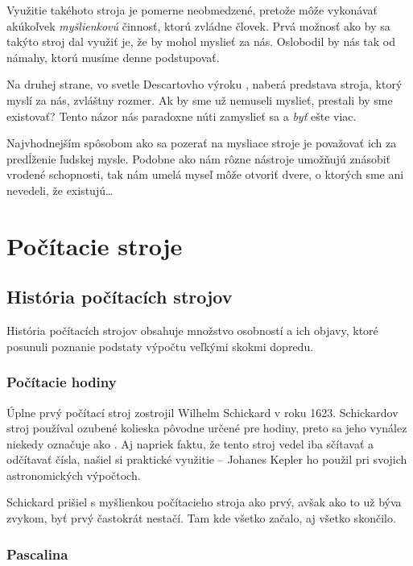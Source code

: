 Využitie takéhoto stroja je pomerne neobmedzené, pretože môže vykonávať akúkoľvek \emph{myšlienkovú} činnosť, ktorú zvládne človek. Prvá možnosť ako by sa takýto stroj dal využiť je, že by mohol myslieť za nás. Oslobodil by nás tak od námahy, ktorú musíme denne podstupovať.

Na druhej strane, vo svetle Descartovho výroku \emph{}, naberá predstava stroja, ktorý myslí za nás, zvláštny rozmer. Ak by sme už nemuseli myslieť, prestali by sme existovať? Tento názor nás paradoxne núti zamyslieť sa a \emph{byť} ešte viac.

Najvhodnejším spôsobom ako sa pozerať na mysliace stroje je považovať ich za predĺženie ľudskej mysle. Podobne ako nám rôzne nástroje umožňujú znásobiť vrodené schopnosti, tak nám umelá myseľ môže otvoriť dvere, o ktorých sme ani nevedeli, že existujú\dots

\section{Počítacie stroje}

\subsection[História]{História počítacích strojov}

História počítacích strojov obsahuje množstvo osobností a ich objavy, ktoré posunuli poznanie podstaty výpočtu veľkými skokmi dopredu.

\subsubsection{Počítacie hodiny}

Úplne prvý počítací stroj zostrojil Wilhelm Schickard v roku 1623. Schickardov stroj používal ozubené kolieska pôvodne určené pre hodiny, preto sa jeho vynález niekedy označuje ako . Aj napriek faktu, že tento stroj vedel iba sčítavať a odčítavať čísla, našiel si praktické využitie -- Johanes Kepler ho použil pri svojich astronomických výpočtoch.

Schickard prišiel s myšlienkou počítacieho stroja ako prvý, avšak ako to už býva zvykom, byť prvý častokrát nestačí. Tam kde všetko začalo, aj všetko skončilo.

\subsubsection{Pascalina}

